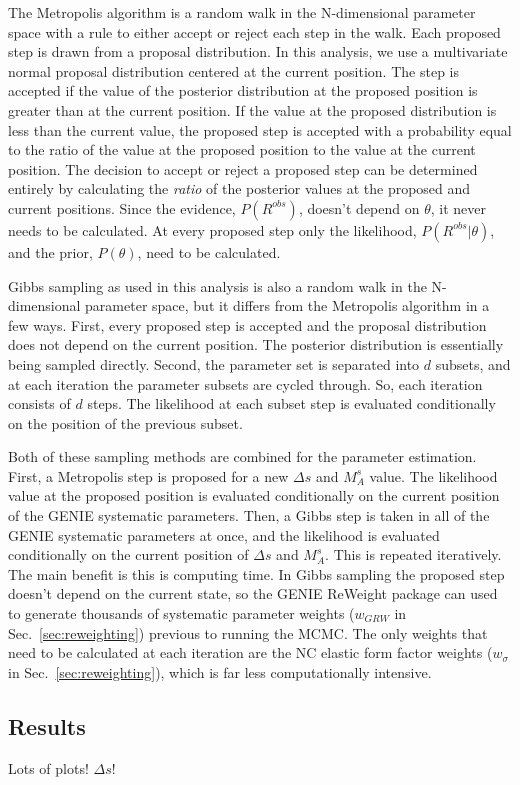     The Metropolis algorithm is a random walk in the N-dimensional parameter
    space with a rule to either accept or reject each step in the walk. Each
    proposed step is drawn from a proposal distribution.  In this analysis, we
    use a multivariate normal proposal distribution centered at the current
    position.  The step is accepted if the value of the posterior distribution
    at the proposed position is greater than at the current position. If the
    value at the proposed distribution is less than the current value, the
    proposed step is accepted with a probability equal to the ratio of the
    value at the proposed position to the value at the current position. The
    decision to accept or reject a proposed step can be determined entirely by
    calculating the \textit{ratio} of the posterior values at the proposed and
    current positions. Since the evidence, $P(R^{obs})$, doesn't depend on
    $\theta$, it never needs to be calculated. At every proposed step only the
    likelihood, $P(R^{obs}|\theta)$, and the prior, $P(\theta)$, need to be
    calculated.

    Gibbs sampling as used in this analysis is also a random walk in the
    N-dimensional parameter space, but it differs from the Metropolis algorithm
    in a few ways. First, every proposed step is accepted and the proposal
    distribution does not depend on the current position. The posterior
    distribution is essentially being sampled directly. Second, the parameter
    set is separated into $d$ subsets, and at each iteration the parameter
    subsets are cycled through. So, each iteration consists of $d$ steps. The
    likelihood at each subset step is evaluated conditionally on the position
    of the previous subset.

    Both of these sampling methods are combined for the parameter estimation.
    First, a Metropolis step is proposed for a new $\Delta s$ and $M_A^s$
    value. The likelihood value at the proposed position is evaluated
    conditionally on the current position of the GENIE systematic parameters.
    Then, a Gibbs step is taken in all of the GENIE systematic parameters at
    once, and the likelihood is evaluated conditionally on the current position
    of $\Delta s$ and $M_A^s$. This is repeated iteratively. The main benefit
    is this is computing time. In Gibbs sampling the proposed step doesn't
    depend on the current state, so the GENIE ReWeight package can used to
    generate thousands of systematic parameter weights ($w_{GRW}$ in
    Sec.~\ref{sec:reweighting}) previous to running the MCMC. The only weights
    that need to be calculated at each iteration are the NC elastic form factor
    weights ($w_{\sigma}$ in Sec.~\ref{sec:reweighting}), which is far less
    computationally intensive.

\subsection{Results}\label{sec:results}
  Lots of plots! $\Delta s$!



